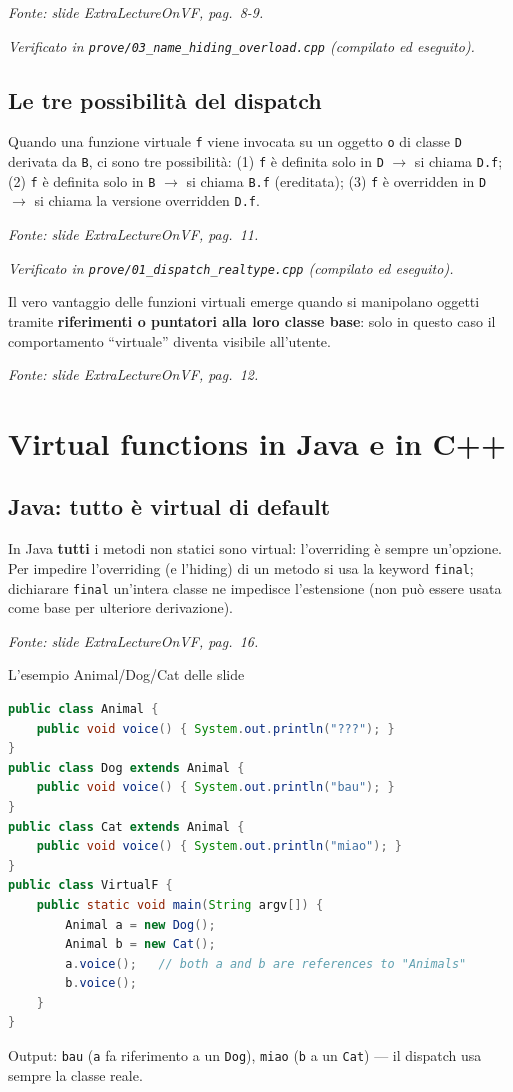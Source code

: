 \documentclass{report}
\newcommand{\code}[1]{\texttt{\small #1}}
\newcommand{\fonteslide}[1]{{\footnotesize\itshape\color{gray} Fonte: slide \emph{ExtraLectureOnVF}, pag.~#1.\par}}
\newcommand{\fonteprove}[1]{{\footnotesize\itshape\color{gray} Verificato in \code{prove/#1} (compilato ed eseguito).\par}}
\begin{document}
\fonteslide{8-9}
\fonteprove{03\_name\_hiding\_overload.cpp}

\section{Le tre possibilità del dispatch}

Quando una funzione virtuale \code{f} viene invocata su un oggetto
\code{o} di classe \code{D} derivata da \code{B}, ci sono tre
possibilità: (1) \code{f} è definita solo in \code{D} $\to$ si chiama
\code{D.f}; (2) \code{f} è definita solo in \code{B} $\to$ si chiama
\code{B.f} (ereditata); (3) \code{f} è overridden in \code{D} $\to$ si
chiama la versione overridden \code{D.f}.


\fonteslide{11}
\fonteprove{01\_dispatch\_realtype.cpp}

Il vero vantaggio delle funzioni virtuali emerge quando si manipolano
oggetti tramite \textbf{riferimenti o puntatori alla loro classe base}:
solo in questo caso il comportamento ``virtuale'' diventa visibile
all'utente.

\fonteslide{12}

\chapter{Virtual functions in Java e in C++}\label{ch:javacpp}

\section{Java: tutto è virtual di default}

In Java \textbf{tutti} i metodi non statici sono virtual: l'overriding è
sempre un'opzione. Per impedire l'overriding (e l'hiding) di un metodo si
usa la keyword \code{final}; dichiarare \code{final} un'intera classe ne
impedisce l'estensione (non può essere usata come base per ulteriore
derivazione).

\fonteslide{16}

\begin{Example}{L'esempio Animal/Dog/Cat delle slide}{}
\begin{lstlisting}[language=Java]
public class Animal {
    public void voice() { System.out.println("???"); }
}
public class Dog extends Animal {
    public void voice() { System.out.println("bau"); }
}
public class Cat extends Animal {
    public void voice() { System.out.println("miao"); }
}
public class VirtualF {
    public static void main(String argv[]) {
        Animal a = new Dog();
        Animal b = new Cat();
        a.voice();   // both a and b are references to "Animals"
        b.voice();
    }
}
\end{lstlisting}
Output: \code{bau} (\code{a} fa riferimento a un \code{Dog}), \code{miao}
(\code{b} a un \code{Cat}) --- il dispatch usa sempre la classe reale.
\end{Example}
\end{document}
